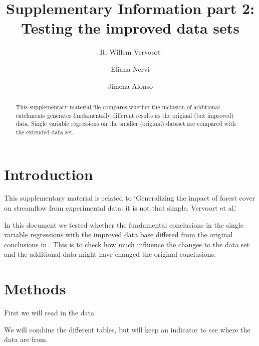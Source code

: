 \documentclass[]{elsarticle} %
\begin{document}
\begin{frontmatter}

  \title{Supplementary Information part 2: Testing the improved data sets}
    \author[]{R. Willem Vervoort%
  }
    \author[]{Eliana Nervi}
    \author[]{Jimena Alonso}
  
  \begin{abstract}
  This supplementary material file compares whether the inclusion of additional catchments generates fundamentally different results as the original (but improved) data. Single variable regressions on the smaller (original) dataset are compared with the extended data set.
  \end{abstract}
  
 \end{frontmatter}

\setcounter{table}{0} \renewcommand{\thetable}{S\arabic{table}} \setcounter{figure}{0} \renewcommand{\thefigure}{S\arabic{figure}}

\hypertarget{introduction}{%
\section{Introduction}\label{introduction}}

This supplementary material is related to `Generalizing the impact of forest cover on streamflow from experimental data: it is not that simple. Vervoort et al.'

In this document we tested whether the fundamental conclusions in the single variable regressions with the improved data base differed from the original conclusions in \citet{zhang2017}. This is to check how much influence the changes to the data set and the additional data might have changed the original conclusions.

\hypertarget{methods}{%
\section{Methods}\label{methods}}

First we will read in the data

We will combine the different tables, but will keep an indicator to see where the data are from.
\end{document}
